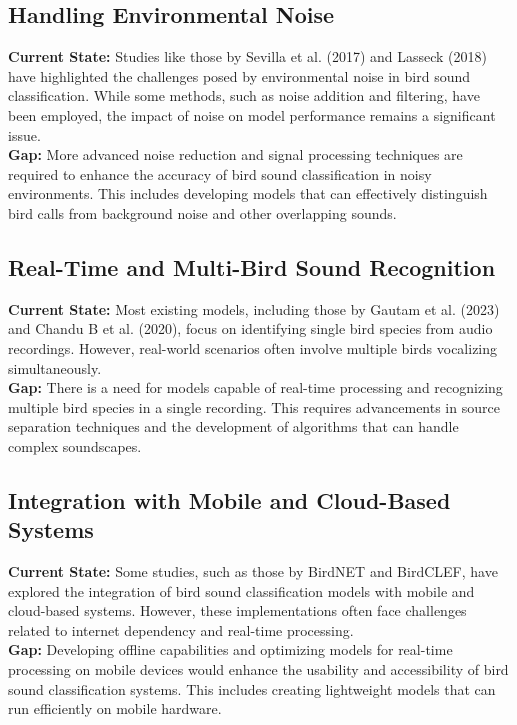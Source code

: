 \subsection{Handling Environmental Noise}
\textbf{Current State:} Studies like those by Sevilla et al. (2017) and Lasseck (2018) have highlighted the challenges posed by environmental noise in bird sound classification. While some methods, such as noise addition and filtering, have been employed, the impact of noise on model performance remains a significant issue.\\
\textbf{Gap:} More advanced noise reduction and signal processing techniques are required to enhance the accuracy of bird sound classification in noisy environments. This includes developing models that can effectively distinguish bird calls from background noise and other overlapping sounds.

\subsection{Real-Time and Multi-Bird Sound Recognition}
\textbf{Current State:} Most existing models, including those by Gautam et al. (2023) and Chandu B et al. (2020), focus on identifying single bird species from audio recordings. However, real-world scenarios often involve multiple birds vocalizing simultaneously.\\
\textbf{Gap:} There is a need for models capable of real-time processing and recognizing multiple bird species in a single recording. This requires advancements in source separation techniques and the development of algorithms that can handle complex soundscapes.

\subsection{Integration with Mobile and Cloud-Based Systems}
\textbf{Current State:} Some studies, such as those by BirdNET and BirdCLEF, have explored the integration of bird sound classification models with mobile and cloud-based systems. However, these implementations often face challenges related to internet dependency and real-time processing.\\
\textbf{Gap:} Developing offline capabilities and optimizing models for real-time processing on mobile devices would enhance the usability and accessibility of bird sound classification systems. This includes creating lightweight models that can run efficiently on mobile hardware.

